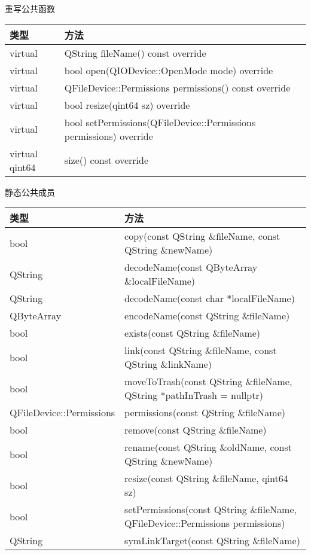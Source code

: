 \splitLine

重写公共函数


\begin{tabular}{|l|l|}
\hline
类型& 	方法\\
\hline
virtual& QString 	fileName() const override\\
\hline
virtual& bool 	open(QIODevice::OpenMode mode) override\\
\hline
virtual& QFileDevice::Permissions 	permissions() const override\\
\hline
virtual& bool 	resize(qint64 sz) override\\
\hline
virtual& bool 	setPermissions(QFileDevice::Permissions permissions)
         override\\
\hline
virtual qint64 &	size() const override\\
\hline
\end{tabular}

\splitLine

静态公共成员

\begin{tabular}{|l|l|}
\hline
类型& 	方法\\
\hline
bool& 	copy(const QString \&fileName, const QString \&newName)\\
\hline
QString& 	decodeName(const QByteArray \&localFileName)\\
\hline
QString& 	decodeName(const char *localFileName)\\
\hline
QByteArray& 	encodeName(const QString \&fileName)\\
\hline
bool& 	exists(const QString \&fileName)\\
\hline
bool& 	link(const QString \&fileName, const QString \&linkName)\\
\hline
bool& 	moveToTrash(const QString \&fileName, QString *pathInTrash =
      nullptr)\\
\hline
QFileDevice::Permissions &	permissions(const QString \&fileName)\\
\hline
bool& 	remove(const QString \&fileName)\\
\hline
bool& 	rename(const QString \&oldName, const QString \&newName)\\
\hline
bool& 	resize(const QString \&fileName, qint64 sz)\\
\hline
bool& 	setPermissions(const QString \&fileName, QFileDevice::Permissions permissions)\\
\hline
QString& 	symLinkTarget(const QString \&fileName)\\
\hline
\end{tabular}


